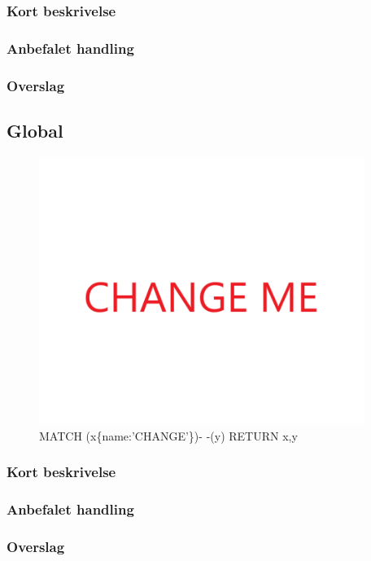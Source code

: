 \documentclass{article}
\begin{document}
\subsubsection{Kort beskrivelse}
\subsubsection{Anbefalet handling}
\subsubsection{Overslag}


\subsection{Global}
\begin{figure}[h]
\includegraphics[width=300pt]{CHANGE.PNG}
\caption{MATCH (x\{name:'CHANGE'\})- -(y) RETURN x,y}
\end{figure}
\subsubsection{Kort beskrivelse}
\subsubsection{Anbefalet handling}
\subsubsection{Overslag}
\end{document}
